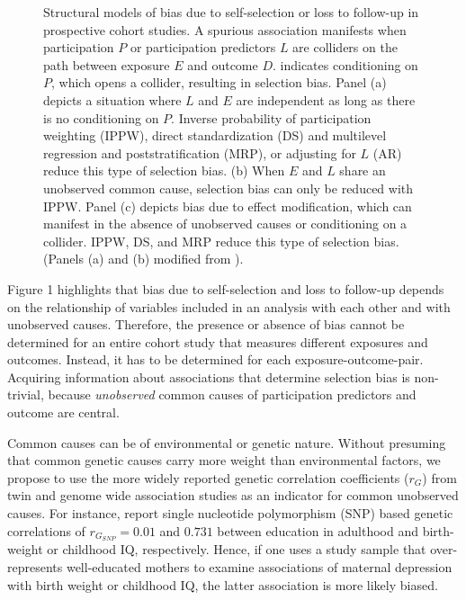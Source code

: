 \documentclass[12pt]{article}
\newcommand*\circled[1]{\tikz[baseline=(char.base)]{
		\node[shape=circle,draw,inner sep=2pt] (char) {#1};}}
\begin{document}
\begin{figure}[h]
	\centering
	\caption{Structural models of bias due to self-selection or loss to follow-up in prospective cohort studies. A spurious association manifests when participation $P$ or participation predictors $L$ are colliders on the path between exposure $E$ and outcome $D$. \protect\circled{$P$} indicates conditioning on $P$, which opens a collider, resulting in selection bias. Panel (a) depicts a situation where $L$ and $E$ are independent as long as there is no conditioning on $P$. Inverse probability of participation weighting (IPPW), direct standardization (DS) and multilevel regression and poststratification (MRP), or adjusting for $L$ (AR) reduce this type of selection bias. (b) When $E$ and $L$ share an unobserved common cause, selection bias can only be reduced with IPPW. Panel (c) depicts bias due to effect modification, which can manifest in the absence of unobserved causes or conditioning on a collider. IPPW, DS, and MRP reduce this type of selection bias. (Panels (a) and (b) modified from \cite{Hernan2004-oz}).}
	\label{fig:SelectionBias}
\end{figure}


Figure 1 highlights that bias due to self-selection and loss to follow-up depends on the relationship of variables included in an analysis with each other and with unobserved causes. Therefore, the presence or absence of bias cannot be determined for an entire cohort study that measures different exposures and outcomes. Instead, it has to be determined for each exposure-outcome-pair. Acquiring information about associations that determine selection bias is non-trivial, because \emph{unobserved} common causes of participation predictors and outcome are central. 

Common causes can be of environmental \cite{Johnson2011-wi,Verweij2013-xk} or genetic nature. Without presuming  that common genetic causes carry more weight than environmental factors, we propose to use the more widely reported genetic correlation coefficients ($r_G$) from twin \cite{Tambs2012-km} and genome wide association studies \cite{Bulik-Sullivan2015-er} as an indicator for common unobserved causes. For instance, \citeauthor{Bulik-Sullivan2015-xn} \cite{Bulik-Sullivan2015-xn} report single nucleotide polymorphism (SNP) based genetic correlations of $r_{G_{SNP}}=0.01$ and $0.731$ between education in adulthood and birth-weight or childhood IQ, respectively. Hence, if one uses a study sample that over-represents well-educated mothers to examine associations of maternal depression with birth weight or childhood IQ, the latter association is more likely biased.
\end{document}
